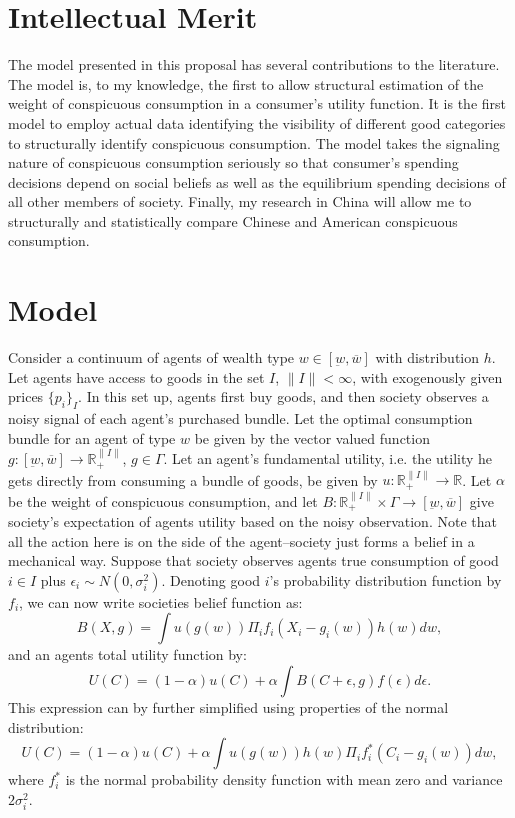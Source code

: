 \documentclass[a4paper,10pt]{article}
\begin{document}
\section{Intellectual Merit}
The model presented in this proposal has several contributions to the literature.  The model is, to my knowledge, the first to allow structural estimation of the weight of conspicuous consumption in a consumer's utility function.  It is the first model to employ actual data identifying the visibility of different good categories to structurally identify conspicuous consumption.  The model takes the signaling nature of conspicuous consumption seriously so that consumer's spending decisions depend on social beliefs as well as the equilibrium spending decisions of all other members of society.  Finally, my research in China will allow me to structurally and statistically compare Chinese and American conspicuous consumption.        

\section{Model}
Consider a continuum of agents of wealth type $w\in[\underbar{w},\overline{w}]$ with distribution $h$.  Let agents have access to goods in the set $I$, $\|I\|<\infty$, with exogenously given prices $\{p_i\}_I$.  In this set up, agents first buy goods, and then society observes a noisy signal of each agent's purchased bundle.  Let the optimal consumption bundle for an agent of type $w$ be given by the vector valued function $g:[\underbar{w},\overline{w}]\rightarrow \mathbb{R}_+^{\|I\|}$, $g\in\Gamma$. Let an agent's fundamental utility, i.e. the utility he gets directly from consuming a bundle of goods, be given by $u:\mathbb{R}_+^{\|I\|}\rightarrow \mathbb{R}$.  Let $\alpha$ be the weight of conspicuous consumption, and let $B:\mathbb{R}_+^{\|I\|}\times \Gamma \rightarrow [\underbar{w},\overline{w}]$ give society's expectation of agents utility based on the noisy observation.  Note that all the action here is on the side of the agent--society just forms a belief in a mechanical way.  Suppose that society observes agents true consumption of good $i\in I$ plus $\epsilon_i \sim N(0,\sigma_i^2)$.  Denoting good $i$'s probability distribution function by $f_i$, we can now write societies belief function as:
\begin{equation}
 B(X,g) = \int u(g(w)) \Pi_i f_i(X_i - g_i(w)) h(w) dw, 
\end{equation}
and an agents total utility function by:
\[ 
 U(C) = (1-\alpha) u(C) + \alpha \int B(C+\epsilon,g) f(\epsilon) d\epsilon.
\]
This expression can by further simplified using properties of the normal distribution:
\begin{equation}
 U(C) = (1-\alpha) u(C) + \alpha \int u(g(w)) h(w) \Pi_i f_i^*(C_i-g_i(w)) dw,
\end{equation}
where $f_i^*$ is the normal probability density function with mean zero and variance $2\sigma_i^2$.
\end{document}
